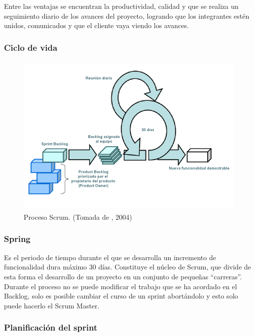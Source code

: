 Entre las ventajas se encuentran la productividad, calidad y que se realiza un seguimiento diario de los avances del proyecto, logrando que los integrantes estén unidos, comunicados y que el cliente vaya viendo los avances.
\setlength{\parskip}{0mm}
\subsubsection{Ciclo de vida}


\begin{figure}[H]
\begin{center}
	\includegraphics[width=13cm,height=8cm]{img/scrum.png}
\end{center}
\caption{Proceso Scrum. (Tomada de \citet{scrumibib}, 2004)}
\label{fig:Scrum}
\end{figure}

\subsubsection{Spring}
\setlength{\parskip}{5mm}

	Es el periodo de tiempo durante el que se desarrolla un incremento de funcionalidad dura máximo 30 días. Constituye el núcleo de Scrum, que divide de esta forma el desarrollo de un proyecto en un conjunto de pequeñas “carreras”. Durante el proceso no se puede modificar el trabajo que se ha acordado en el Backlog, solo es posible cambiar el curso de un sprint abortándolo y esto solo puede hacerlo el Scrum Master. 
	
\setlength{\parskip}{0mm}

\subsubsection{Planificación del sprint}
\setlength{\parskip}{5mm}

